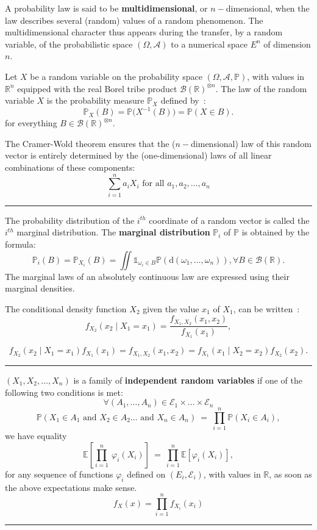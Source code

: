 \begin{f}
			
			
A probability law is said to be \textbf{multidimensional}, or \(n-\)dimensional, when the law describes several (random) values of a random phenomenon.
The multidimensional character thus appears during the transfer, by a random variable, of the probabilistic space \((\Omega,\mathcal{A})\) to a numerical space \(E^n\) of dimension \(n\).

Let \(X\) be a random variable on the probability space \((\Omega, \mathcal A, \mathbb{P})\), with values in \({\mathbb{R}}^n\) equipped with the real Borel tribe product \({\mathcal {B}(\mathbb{R})}^{\otimes n}\).
The law of the random variable \(X\) is the probability measure \(\mathbb{P}_X\) defined by~:
\[
\mathbb{P}_X(B) = \mathbb{P}\big(X^{-1}(B)\big) = \mathbb{P}(X \in B).
\]
for everything \(B \in {\mathcal B(\mathbb R)}^{\otimes n}\).

The Cramer-Wold theorem ensures that the (\(n-\)dimensional) law of this random vector is entirely determined by the (one-dimensional) laws of all linear combinations of these components:
\[\sum_{i = 1}^n a_i X_i\mbox{ for all }a_1, a_2, \dots, a_n\]


\end{f}
\hrule

\begin{f}
The probability distribution of the \(i^{th}\) coordinate of a random vector is called the \(i^{th}\) marginal distribution. The \textbf{marginal distribution} \(\mathbb{P}_i\) of \(\mathbb{P}\) is obtained by the formula:
\[
\mathbb{P}_i(B) = \mathbb{P}_{X_i}(B) = \iint { \mathds{1}}_{\omega_i\in B} \mathbb{P}(\mathrm{d}(\omega_1,\dots,\omega_n)), \forall  B \in \mathcal B(\mathbb{R}).
\]
The marginal laws of an absolutely continuous law are expressed using their marginal densities.


The conditional density function \(X_2\) given the value \(x_1\) of \(X_1\), can be written~:
\[
f_{X_2}(x_2 \mid X_1=x_1) = \frac{f_{X_1, X_2}(x_1,x_2)}{f_{X_1}(x_1)}, 
\]

\[
f_{X_2}(x_2 \mid X_1=x_1)f_{X_1}(x_1) = f_{X_1,X_2}(x_1, x_2) = f_{X_1}(x_1 \mid X_2=x_2)f_{X_2}(x_2). 
\]
\end{f}
\hrule

	\begin{f}[Independence]
\((X_1, X_2, \dots,X_n)\) is a family of \textbf{independent random variables} if one of the following two conditions is met:
\[
\forall (A_1,\dots,A_n)\in\mathcal{E}_1\times\dots\times\mathcal{E}_n
\]
\[
\mathbb{P}(X_1\in A_1\text{ and }X_2\in A_2\dots\text{ and }X_n\in A_n)\ =\ \prod_{i=1}^n\mathbb{P}(X_i\in A_i),
\]
we have equality
\[
\mathbb{E}\left[\prod_{i=1}^n\ \varphi_i(X_i)\right]\ =\ \prod_{i=1}^n\mathbb{E}\left[\varphi_i(X_i)\right],
\]
for any sequence of functions \(\varphi_i\) defined on \((E_i,\mathcal{E}_i)\), with values in \(\mathbb{R}\), as soon as the above expectations make sense.
\[
f_X(x)= \prod_{i=1}^{n}f_{X_i}(x_i)
\]
\end{f}
\hrule




